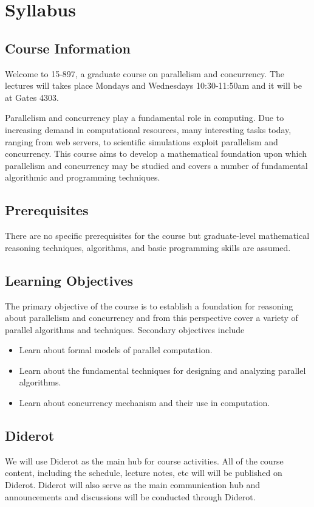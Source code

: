 \chapter*{Syllabus}
\label{ch:syllabus}

\section{Course Information}

Welcome to 15-897, a graduate course on parallelism and concurrency. 
%
The lectures will takes place Mondays and Wednesdays 10:30-11:50am and it will be at Gates 4303. 

Parallelism and concurrency play a  fundamental role in computing.
%
Due to increasing demand in computational resources, many interesting tasks today, ranging from web servers, to scientific simulations exploit parallelism and concurrency.
%
This course aims to develop a mathematical foundation upon which parallelism and concurrency may be studied and covers a number of fundamental algorithmic and programming techniques.  
%
 


\section{Prerequisites}
There are no specific prerequisites for the course but graduate-level mathematical reasoning techniques, algorithms, and basic programming skills are assumed.
%

\section{Learning Objectives}

The primary objective of the course is to establish a foundation for reasoning about parallelism and concurrency and from this perspective cover a variety of parallel algorithms and techniques.
%
Secondary objectives include
\begin{itemize}
\item Learn about formal models of parallel computation.
\item Learn about the fundamental techniques for designing and analyzing parallel algorithms.
\item Learn about concurrency mechanism and their use in computation. 
\end{itemize}


\section{Diderot}
We will use Diderot as the main hub for course activities.
%
All of the course content, including the schedule, lecture notes, etc will 
will be published on Diderot. 
%
Diderot will also serve as the main communication hub and
announcements and discussions will be conducted through Diderot.
%

